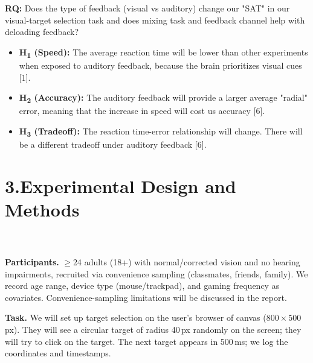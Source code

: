 \documentclass[12pt,letterpaper]{article}
\begin{document}
\textbf{RQ:} Does the type of feedback (visual vs auditory) change our "SAT" in our visual-target selection task and does mixing task and feedback channel help with deloading feedback?
\begin{itemize}
  \item \textbf{H\textsubscript{1} (Speed):} The average reaction time will be lower than other experiments when exposed to auditory feedback, because the brain prioritizes visual cues [1].
  \item \textbf{H\textsubscript{2} (Accuracy):} The auditory feedback will provide a larger average "radial" error, meaning that the increase in speed will cost us accuracy [6].
  \item \textbf{H\textsubscript{3} (Tradeoff):} The reaction time-error relationship will change. There will be a different tradeoff under auditory feedback [6].
\end{itemize}

\section*{3.\enspace Experimental Design and Methods}

\noindent{}
\\\\
\noindent\textbf{Participants.} $\ge$24 adults (18+) with normal/corrected vision and no hearing impairments, recruited via convenience sampling (classmates, friends, family). We record age range, device type (mouse/trackpad), and gaming frequency as covariates. Convenience-sampling limitations will be discussed in the report.

\noindent\textbf{Task.} We will set up target selection on the user's browser of canvas ($800\!\times\!500$\,px). They will see a circular target of radius 40\,px randomly on the screen; they will try to click on the target. The next target appears in 500\,ms; we log the coordinates and timestamps.
\end{document}
